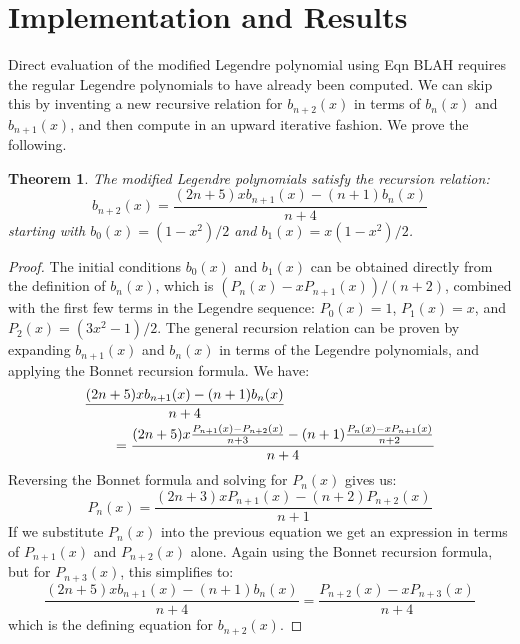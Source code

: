 \documentclass{article}
\theoremstyle{plain}
\newtheorem{theorem}{Theorem}
\begin{document}
    \section{Implementation and Results}
        Direct evaluation of the modified Legendre polynomial using Eqn BLAH
        requires the regular Legendre polynomials to have already been
        computed. We can skip this by inventing a new recursive relation
        for $b_{n+2}(x)$ in terms of $b_{n}(x)$ and $b_{n+1}(x)$, and then
        compute in an upward iterative fashion. We prove the following.
        \begin{theorem}
            The modified Legendre polynomials satisfy the recursion relation:
            \begin{equation}
                b_{n+2}(x)=
                \frac{(2n+5)xb_{n+1}(x)-(n+1)b_{n}(x)}{n+4}
            \end{equation}
            starting with $b_{0}(x)=(1-x^{2})/2$ and $b_{1}(x)=x(1-x^{2})/2$.
        \end{theorem}
        \begin{proof}
            The initial conditions $b_{0}(x)$ and $b_{1}(x)$ can be obtained
            directly from the definition of $b_{n}(x)$, which is
            $(P_{n}(x)-xP_{n+1}(x))/(n+2)$, combined with the first few
            terms in the Legendre sequence: $P_{0}(x)=1$, $P_{1}(x)=x$, and
            $P_{2}(x)=(3x^{2}-1)/2$. The general recursion relation can be
            proven by expanding $b_{n+1}(x)$ and $b_{n}(x)$ in terms of the
            Legendre polynomials, and applying the Bonnet recursion formula.
            We have:
            \begin{equation}
                \begin{aligned}
                    &\frac{(2n+5)xb_{n+1}(x)-(n+1)b_{n}(x)}{n+4}\\
                    &\quad\quad=\frac{%
                        (2n+5)x\frac{P_{n+1}(x)-P_{n+2}(x)}{n+3}-
                        (n+1)\frac{P_{n}(x)-xP_{n+1}(x)}{n+2}
                    }{n+4}
                \end{aligned}
            \end{equation}
            Reversing the Bonnet formula and solving for $P_{n}(x)$ gives us:
            \begin{equation}
                P_{n}(x)=\frac{(2n+3)xP_{n+1}(x)-(n+2)P_{n+2}(x)}{n+1}
            \end{equation}
            If we substitute $P_{n}(x)$ into the previous equation we get an
            expression in terms of $P_{n+1}(x)$ and $P_{n+2}(x)$ alone.
            Again using the Bonnet recursion formula, but for $P_{n+3}(x)$,
            this simplifies to:
            \begin{equation}
                \frac{(2n+5)xb_{n+1}(x)-(n+1)b_{n}(x)}{n+4}
                =\frac{P_{n+2}(x)-xP_{n+3}(x)}{n+4}
            \end{equation}
            which is the defining equation for $b_{n+2}(x)$.
        \end{proof}
\end{document}
